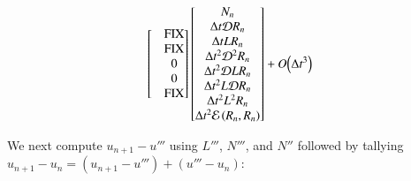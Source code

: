 \documentclass[letterpaper,11pt]{amsart}
\newcommand{\order}[2]{\ensuremath{O\!\left( {#1}^{#2} \right)}}
\begin{document}
\begin{subequations}
\begin{align}
{\begin{bmatrix}
  &\mbox{FIX} \\
  &\mbox{FIX} \\
  &0 \\
  &0 \\
  &\mbox{FIX}
\end{bmatrix}}
\begin{bmatrix}
  N_{n} \\
  \Delta{}t \mathcal{D} R_{n} \\
  \Delta{}t L R_{n} \\
  \Delta{}t^{2} \mathcal{D}^{2} R_{n} \\
  \Delta{}t^{2} \mathcal{D} L R_{n} \\
  \Delta{}t^{2} L \mathcal{D} R_{n} \\
  \Delta{}t^{2} L^{2} R_{n} \\
  \Delta{}t^{2} \mathcal{E}\left( R_{n}, R_{n} \right)
\end{bmatrix}
  + \order{\Delta{}t}{3}
\notag
\end{align}
\end{subequations}

We next compute $u_{n+1}-u'''$ using $L'''$, $N'''$, and $N''$ followed by
tallying $u_{n+1}-u_{n} = (u_{n+1}-u''')+(u'''-u_{n})$:
\end{document}
